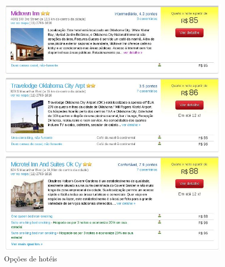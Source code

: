 \documentclass[brazil]{article}
\begin{document}
\begin{figure}[htp]
\begin{center}
  \includegraphics[width=\linewidth]{hoteis.png}
  \caption[Opções de hotéis]{Opções de hotéis}
\end{center}
\end{figure}
\end{document}
